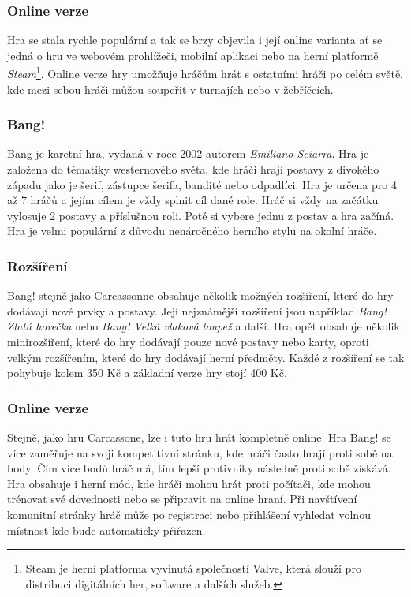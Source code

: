 \subsubsection*{Online verze}
Hra se stala rychle populární a tak se brzy objevila i její online varianta ať se jedná o hru ve webovém prohlížeči, mobilní aplikaci nebo na herní platformě \textit{Steam}\footnote{Steam je herní platforma vyvinutá společností Valve, která slouží pro distribuci digitálních her, software a dalších služeb.}. Online verze hry umožňuje hráčům hrát s ostatními hráči po celém světě, kde mezi sebou hráči můžou soupeřit v turnajích nebo v žebříčcích.

\subsubsection{Bang!}
\label{subsubsec:popular-board-games-analysis-bang}
Bang je karetní hra, vydaná v roce 2002 autorem \textit{Emiliano Sciarra}. Hra je založena do tématiky westernového světa, kde hráči hrají postavy z divokého západu jako je šerif, zástupce šerifa, bandité nebo odpadlíci. Hra je určena pro 4 až 7 hráčů a jejím cílem je vždy splnit cíl dané role. Hráč si vždy na začátku vylosuje 2 postavy a příslušnou roli. Poté si vybere jednu z postav a hra začíná. Hra je velmi populární z důvodu nenáročného herního stylu na okolní hráče.

\subsubsection*{Rozšíření}
\label{subsubsec:popular-board-games-analysis-bang-expansions}
Bang! stejně jako Carcassonne obsahuje několik možných rozšíření, které do hry dodávají nové prvky a postavy. Její nejznámější rozšíření jsou například \textit{Bang! Zlatá horečka} nebo \textit{Bang! Velká vlaková loupež} a další. Hra opět obsahuje několik minirozšíření, které do hry dodávají pouze nové postavy nebo karty, oproti velkým rozšířením, které do hry dodávají herní předměty. Každé z rozšíření se tak pohybuje kolem 350 Kč a základní verze hry stojí 400 Kč.

\subsubsection*{Online verze}
Stejně, jako hru Carcassone, lze i tuto hru hrát kompletně online. Hra Bang! se více zaměřuje na svoji kompetitivní stránku, kde hráči často hrají proti sobě na body. Čím více bodů hráč má, tím lepší protivníky následně proti sobě získává. Hra obsahuje i herní mód, kde hráči mohou hrát proti počítači, kde mohou trénovat své dovednosti nebo se připravit na online hraní. Při navštívení komunitní stránky hráč může po registraci nebo přihlášení vyhledat volnou místnost kde bude automaticky přiřazen.

